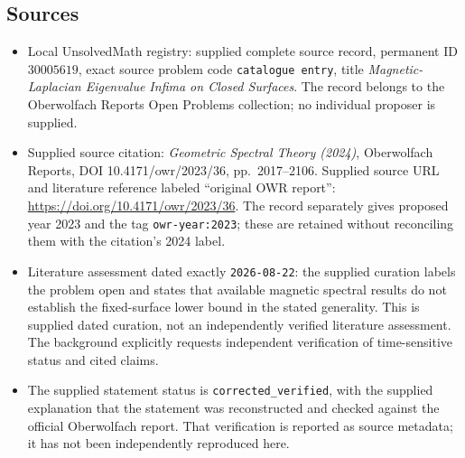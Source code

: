 \documentclass[11pt]{article}
\begin{document}
\subsection{Sources}
\begin{itemize}
\item Local UnsolvedMath registry: supplied complete source record, permanent ID \(30005619\), exact source problem code \texttt{catalogue entry}, title \emph{Magnetic-Laplacian Eigenvalue Infima on Closed Surfaces}. The record belongs to the Oberwolfach Reports Open Problems collection; no individual proposer is supplied.
\item Supplied source citation: \emph{Geometric Spectral Theory (2024)}, Oberwolfach Reports, DOI 10.4171/owr/2023/36, pp.\ 2017--2106. Supplied source URL and literature reference labeled ``original OWR report'': \url{https://doi.org/10.4171/owr/2023/36}. The record separately gives proposed year 2023 and the tag \texttt{owr-year:2023}; these are retained without reconciling them with the citation's 2024 label.
\item Literature assessment dated exactly \texttt{2026-08-22}: the supplied curation labels the problem open and states that available magnetic spectral results do not establish the fixed-surface lower bound in the stated generality. This is supplied dated curation, not an independently verified literature assessment. The background explicitly requests independent verification of time-sensitive status and cited claims.
\item The supplied statement status is \texttt{corrected\_verified}, with the supplied explanation that the statement was reconstructed and checked against the official Oberwolfach report. That verification is reported as source metadata; it has not been independently reproduced here.
\end{itemize}
\end{document}
